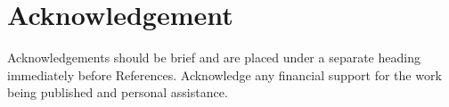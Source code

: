 \documentclass{strrespaper-journ}
\begin{document}
    \section{Acknowledgement}
		Acknowledgements should be brief and are placed under a separate heading immediately before References.
		Acknowledge any financial support for the work being published and personal assistance.

		\nocite{letcherWindEnergyEngineering2017}
		\nocite{al-shemmeriWindTurbines2010}
		\nocite{trewbyWindEnergyImplications2014}

    \printbibliography
\end{document}
